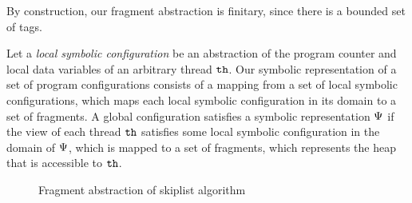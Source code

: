 By construction, our fragment abstraction is finitary, since there is
a bounded set of tags.

Let a {\em local symbolic configuration} be an abstraction of the program
counter and local data variables of an arbitrary thread ${\tt th}$.
Our symbolic representation of a set of program configurations consists of
a mapping from a set of local symbolic configurations,
which maps each local symbolic configuration in its domain to a set of fragments.
A global configuration satisfies a symbolic representation $\Psi$
if the view of each thread ${\tt th}$ satisfies some local symbolic
configuration in the domain of $\Psi$, which is mapped to a set
of fragments, which represents the heap that is accessible to ${\tt th}$.

\begin{figure}
\center
	
\caption{Fragment abstraction of skiplist algorithm}
\label{fig:skiplistabs}
\end{figure} 


